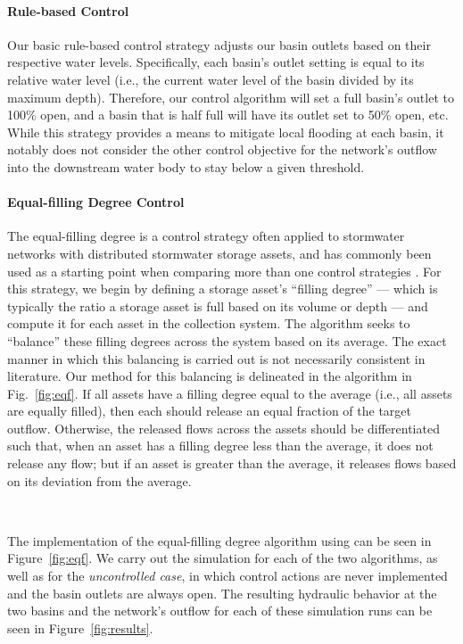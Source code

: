 \paragraph{Rule-based Control}
Our basic rule-based control strategy adjusts our basin outlets based on their respective water levels. Specifically, each basin's outlet setting is equal to its relative water level (i.e., the current water level of the basin divided by its maximum depth). Therefore, our control algorithm will set a full basin's outlet to 100\% open, and a basin that is half full will have its outlet set to 50\% open, etc. While this strategy provides a means to mitigate local flooding at each basin, it notably does not consider the other control objective for the network's outflow into the downstream water body to stay below a given threshold.
%
%
%
\paragraph{Equal-filling Degree Control}
The equal-filling degree is a control strategy often applied to stormwater networks with distributed stormwater storage assets, and has commonly been used as a starting point when comparing more than one control strategies \citep{Borsanyi2008, Campisano2000, Dirckz2011, Kroll2016, vezzaro2014}. For this strategy, we begin by defining a storage asset's ``filling degree'' --- which is typically the ratio a storage asset is full based on its volume or depth --- and compute it for each asset in the collection system. The algorithm seeks to ``balance'' these filling degrees across the system based on its average. The exact manner in which this balancing is carried out is not necessarily consistent in literature. Our method for this balancing is delineated in the algorithm in Fig.~\ref{fig:eqf}. If all assets have a filling degree equal to the average (i.e., all assets are equally filled), then each should release an equal fraction of the target outflow. Otherwise, the released flows across the assets should be differentiated such that, when an asset has a filling degree less than the average, it does not release any flow; but if an asset is greater than the average, it releases flows based on its deviation from the average. 

\

The implementation of the equal-filling degree algorithm using \pystorms can be seen in Figure~\ref{fig:eqf}. We carry out the simulation for each of the two algorithms, as well as for the \emph{uncontrolled case}, in which control actions are never implemented and the basin outlets are always open. The resulting hydraulic behavior at the two basins and the network's outflow for each of these simulation runs can be seen in Figure~\ref{fig:results}. 

